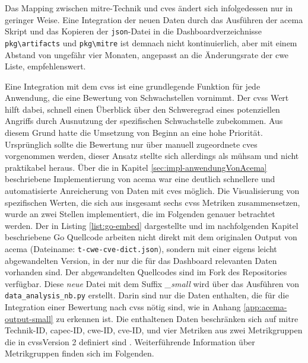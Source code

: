 Das Mapping zwischen \gls{mitre}-Technik und \glspl{cve} ändert sich infolgedessen nur in geringer Weise. Eine Integration der neuen Daten durch das Ausführen der \gls{acema} Skript und das Kopieren der \verb|json|-Datei in die Dashboardverzeichnisse \verb|pkg\artifacts| und \verb|pkg\mitre| ist demnach nicht kontinuierlich, aber mit einem Abstand von ungefähr vier Monaten, angepasst an die Änderungsrate der \gls{cwe} Liste, empfehlenswert.

\label{sec:impl-cvssIntegration}
Eine Integration mit dem \gls{cvss} ist eine grundlegende Funktion für jede Anwendung, die eine Bewertung von Schwachstellen vornimmt. Der \gls{cvss} Wert hilft dabei, schnell einen Überblick über den Schweregrad eines potenziellen Angriffs durch Ausnutzung der spezifischen Schwachstelle zubekommen. Aus diesem Grund hatte die Umsetzung von Beginn an eine hohe Priorität. Ursprünglich sollte die Bewertung nur über manuell zugeordnete \glspl{cve} vorgenommen werden, dieser Ansatz stellte sich allerdings als mühsam und nicht praktikabel heraus. Über die in Kapitel \ref{sec:impl-anwendungVonAcema} beschriebene Implementierung von \gls{acema} war eine deutlich schnellere und automatisierte Anreicherung von Daten mit \glspl{cve} möglich. Die Visualisierung von spezifischen Werten, die sich aus insgesamt sechs \gls{cvss} Metriken zusammensetzen, wurde an zwei Stellen implementiert, die im Folgenden genauer betrachtet werden.
Der in Listing \ref{list:go-embed} dargestellte und im nachfolgenden Kapitel beschriebene Go Quellcode arbeiten nicht direkt mit dem originalen Output von \gls{acema} (Dateiname: \verb|t-cwe-cve-dict.json|), sondern mit einer eigens leicht abgewandelten Version, in der nur die für das Dashboard relevanten Daten vorhanden sind. Der abgewandelten Quellcodes sind im Fork \autocite{jesseDumpeldownAcema_oranDev} des Repositories \autocite{klement2023acema} verfügbar. Diese \textit{neue} Datei mit dem Suffix \textit{\_small} wird über das Ausführen von \verb|data_analysis_nb.py| erstellt. Darin sind nur die Daten enthalten, die für die Integration einer Bewertung nach \gls{cvss} nötig sind, wie in Anhang \ref{app:acema-output-small} zu erkennen ist. Die enthaltenen Daten beschränken sich auf \gls{mitre} Technik-ID, \gls{capec}-ID, \gls{cwe}-ID, \gls{cve}-ID, und vier Metriken aus zwei Metrikgruppen die in \gls{cvss}Version 2 definiert sind \autocite{CVSSV2Complete}. Weiterführende Information über Metrikgruppen finden sich im Folgenden.

